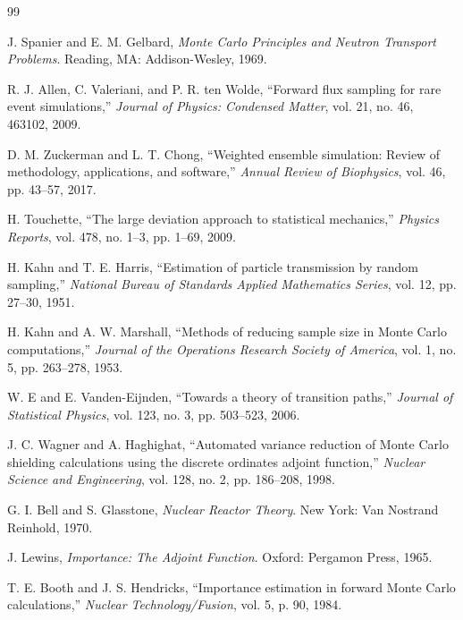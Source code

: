 \documentclass[11pt]{article}
\begin{document}
	\begin{thebibliography}{99}
		\setlength{\itemsep}{1pt}
		
		J. Spanier and E. M. Gelbard, \emph{Monte Carlo Principles and Neutron Transport Problems}. Reading, MA: Addison-Wesley, 1969.
		
		R. J. Allen, C. Valeriani, and P. R. ten Wolde, ``Forward flux sampling for rare event simulations,'' \emph{Journal of Physics: Condensed Matter}, vol. 21, no. 46, 463102, 2009.
		
		D. M. Zuckerman and L. T. Chong, ``Weighted ensemble simulation: Review of methodology, applications, and software,'' \emph{Annual Review of Biophysics}, vol. 46, pp. 43--57, 2017.
		
		H. Touchette, ``The large deviation approach to statistical mechanics,'' \emph{Physics Reports}, vol. 478, no. 1--3, pp. 1--69, 2009.
		
		H. Kahn and T. E. Harris, ``Estimation of particle transmission by random sampling,'' \emph{National Bureau of Standards Applied Mathematics Series}, vol. 12, pp. 27--30, 1951.
		
		H. Kahn and A. W. Marshall, ``Methods of reducing sample size in Monte Carlo computations,'' \emph{Journal of the Operations Research Society of America}, vol. 1, no. 5, pp. 263--278, 1953.
		
		W. E and E. Vanden-Eijnden, ``Towards a theory of transition paths,'' \emph{Journal of Statistical Physics}, vol. 123, no. 3, pp. 503--523, 2006.
		
		J. C. Wagner and A. Haghighat, ``Automated variance reduction of Monte Carlo shielding calculations using the discrete ordinates adjoint function,'' \emph{Nuclear Science and Engineering}, vol. 128, no. 2, pp. 186--208, 1998.
		
		G. I. Bell and S. Glasstone, \emph{Nuclear Reactor Theory}. New York: Van Nostrand Reinhold, 1970.
		
		J. Lewins, \emph{Importance: The Adjoint Function}. Oxford: Pergamon Press, 1965.
		
		T. E. Booth and J. S. Hendricks, ``Importance estimation in forward Monte Carlo calculations,'' \emph{Nuclear Technology/Fusion}, vol. 5, p. 90, 1984.
		

\end{thebibliography}
\end{document}
